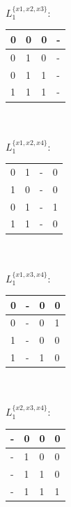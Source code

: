 \documentclass{scrartcl}
\begin{document}
\begin{itemize}
\begin{minipage}{0.3\textwidth}
\begin{tabular}{llll}
	\end{tabular}
	\end{minipage}	
	\begin{minipage}{0.3\textwidth}	
	$ L_{1}^{\{x1,x2,x3\}}: $\\
	\begin{tabular}{llll}
		0 & 0 & 0 & -\\ \hline
		0 & 1 & 0 & -\\ \hline
		0 & 1 & 1 & -\\ \hline
		1 & 1 & 1 & -\\ 
	\end{tabular}\\\\
	$ L_{1}^{\{x1,x2,x4\}}: $\\
	\begin{tabular}{llll}
		0 & 1 & - & 0\\
		1 & 0 & - & 0\\ \hline
		0 & 1 & - & 1\\
		1 & 1 & - & 0\\ 
	\end{tabular}\\\\
	$ L_{1}^{\{x1,x3,x4\}}: $\\
	\begin{tabular}{llll}
		0 & - & 0 & 0\\ \hline
		0 & - & 0 & 1\\
		1 & - & 0 & 0\\ \hline
		1 & - & 1 & 0\\ 
	\end{tabular}\\\\
	$ L_{1}^{\{x2,x3,x4\}}: $\\
	\begin{tabular}{llll}
		- & 0 & 0 & 0\\ \hline
		- & 1 & 0 & 0\\ \hline
		- & 1 & 1 & 0\\ \hline
		- & 1 & 1 & 1\\ 
	\end{tabular}\\\\

	\end{minipage}


\end{itemize}
\end{document}
